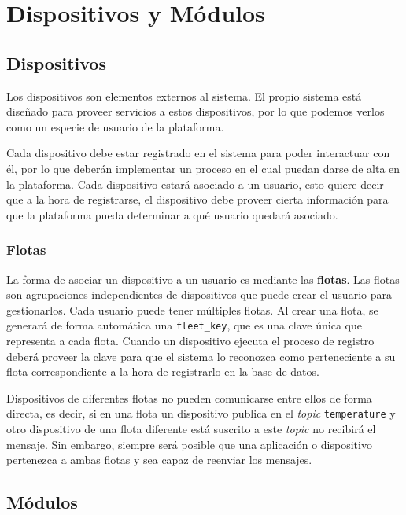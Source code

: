 \chapter{Dispositivos y Módulos}
\pagestyle{esitscCD}

\section{Dispositivos}

Los dispositivos son elementos externos al sistema. El propio sistema está
diseñado para proveer servicios a estos dispositivos, por lo que podemos verlos
como un especie de usuario de la plataforma.

Cada dispositivo debe estar registrado en el sistema para poder interactuar con
él, por lo que deberán implementar un proceso en el cual puedan darse de alta en
la plataforma. Cada dispositivo estará asociado a un usuario, esto quiere decir
que a la hora de registrarse, el dispositivo debe proveer cierta información
para que la plataforma pueda determinar a qué usuario quedará asociado.

\subsection{Flotas}

La forma de asociar un dispositivo a un usuario es mediante las \textbf{flotas}.
Las flotas son agrupaciones independientes de dispositivos que puede crear el
usuario para gestionarlos. Cada usuario puede tener múltiples flotas. Al crear
una flota, se generará de forma automática una \texttt{fleet\_key}, que es una clave única
que representa a cada flota. Cuando un dispositivo ejecuta el proceso de
registro deberá proveer la clave para que el sistema lo reconozca como
perteneciente a su flota correspondiente a la hora de registrarlo en la base
de datos.

Dispositivos de diferentes flotas no pueden comunicarse entre ellos de forma
directa, es decir, si en una flota un dispositivo publica en el \emph{topic}
\texttt{temperature} y otro dispositivo de una flota diferente está suscrito
a este \emph{topic} no recibirá el mensaje. Sin embargo, siempre será posible
que una aplicación o dispositivo pertenezca a ambas flotas y sea capaz de
reenviar los mensajes.


\section{Módulos}


